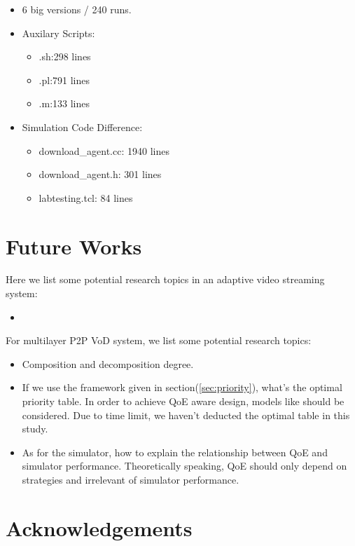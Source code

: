 \documentclass[11pt,a4paper]{article}
\begin{document}
\begin{itemize}
	\item 6 big versions / 240 runs. 
	\item Auxilary Scripts:
	\begin{itemize}
	\item .sh:298 lines
	\item .pl:791  lines
	\item .m:133 lines
	\end{itemize}
	\item Simulation Code Difference:	
	\begin{itemize}
		\item download\_agent.cc: 1940 lines
		\item download\_agent.h: 301 lines
		\item labtesting.tcl: 84 lines
	\end{itemize}
\end{itemize}


\section{Future Works}

Here we list some potential research topics in an adaptive video streaming 
system:
\begin{itemize}
	\item 
\end{itemize} 

For multilayer P2P VoD system, we list some potential research topics:
\begin{itemize}
	\item Composition and decomposition degree. 
	\item If we use the framework given in section(\ref{sec:priority}), 
	what's the optimal priority table. In order to achieve QoE aware design, 
	models like \cite{wang2011-perceptual} should be considered. Due to 
	time limit, we haven't deducted the optimal table in this study. 
	\item As for the simulator, how to explain the relationship between 
	QoE and simulator performance. Theoretically speaking, QoE should only 
	depend on strategies and irrelevant of simulator performance. 
\end{itemize}



\section*{Acknowledgements}
\end{document}
